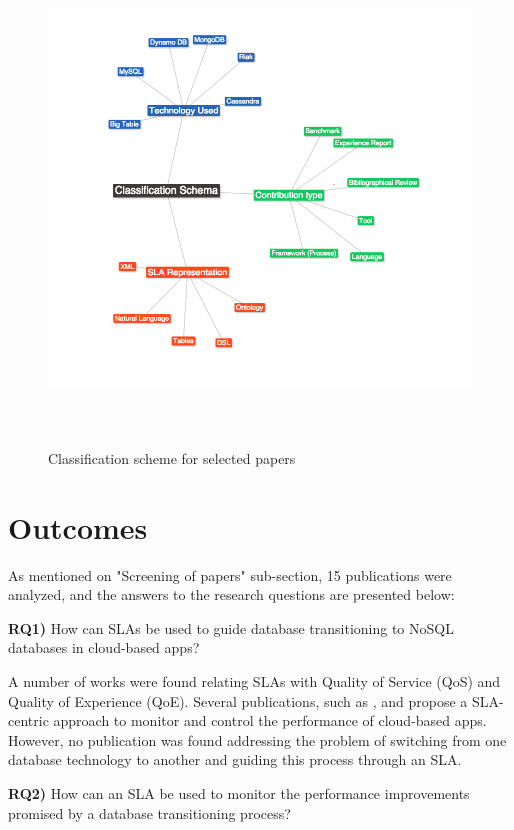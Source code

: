 \documentclass{article}
\begin{document}
\begin{figure}[!h]
\centering
\includegraphics[height=130mm]{pic2.png}
\caption{Classification scheme for selected papers \label{overflow}}
\end{figure}

\section{Outcomes}

As mentioned on "Screening of papers" sub-section, 15 publications were analyzed, and the answers to the research questions are presented below:

\textbf{RQ1)} How can SLAs be used to guide database transitioning to NoSQL databases in cloud-based apps? 

A number of works were found relating SLAs with Quality of Service (QoS) and Quality of Experience (QoE). Several publications, such as \cite{Xiong:2012:DMR:2213598.2213614}, \cite{Konstantinou:2012:TEN:2213836.2213943} and \cite{Klems:2012:RQM:2477172.2477488} propose a SLA-centric approach to monitor and control the performance of cloud-based apps. However, no publication was found addressing the problem of switching from one database technology to another and guiding this process through an SLA. 

\textbf{RQ2)} How can an SLA be used to monitor the performance improvements promised by a database transitioning process?
\end{document}
